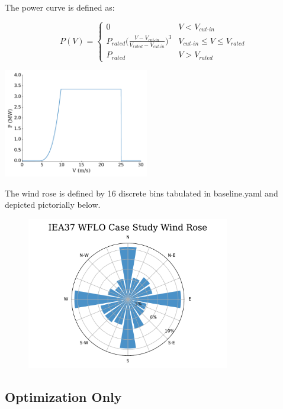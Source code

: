 \documentclass{article}
\begin{document}
The power curve is defined as:   

\begin{minipage}{0.5\textwidth}
    \begin{equation*}
        P(V) = 
        \begin{cases} 
            0 & V < V_{\textit{cut-in}} \\
            P_{\textit{rated}}\bigg(\frac{V-V_{\textit{cut-in}}}{V_{\textit{rated}}-V_{\textit{cut-in}}}\bigg)^3 & V_{\textit{cut-in}}\leq V \leq V_{\textit{rated}} \\
            P_{\textit{rated}} & V > V_{\textit{rated}}
        \end{cases}
    \label{eq:power}
    \end{equation*}
\end{minipage}\qquad
\begin{minipage}{0.5\textwidth}
    \includegraphics[width=2.5in]{power_curve}
\end{minipage}


The wind rose is defined by 16 discrete bins tabulated in baseline.yaml and depicted pictorially below.

\begin{figure}[h!]
    \centering
    \includegraphics[width=3.5in]{iea37-wflo-casestudy-windrose}
\end{figure}

\subsection{Optimization Only}
\end{document}
